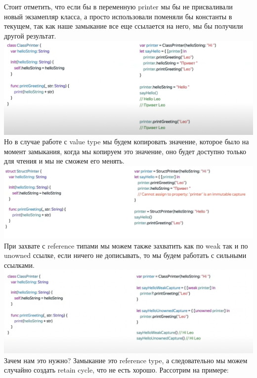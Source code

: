 \documentclass{article}
\begin{document}
    \newline
    Стоит отметить, что если бы в переменную printer мы бы не присваливали новый экзамепляр класса, а просто использовали поменяли бы константы в текущем, так как наше замыкание все еще ссылается на него, мы бы получили другой результат. 
    \newline
    \includegraphics[scale = 0.2]{pic/closurePrinterRefTypeSwiftAdv.png}
    \newline
    Но в случае работе с value type мы будем копировать значение, которое было на момент замыкания, когда мы копируем это значение, оно будет доступно только для чтения и мы не сможем его менять.
    \newline
    \includegraphics[scale = 0.4]{pic/closuerValueTypeSwiftAdv.png}
    \newline
    При захвате с reference типами мы можем также захватить как по weak так и по unowned ссылке, если ничего не дописывать, то мы будем работать с сильными ссылками. 
    \newline
    \includegraphics[scale = 0.4]{pic/Снимок экрана 2023-07-27 в 23.31.18.png}
    \newline
    Зачем нам это нужно? Замыкание это reference type, а следовательно мы можем случайно создать retain cycle, что не есть хорошо. Рассотрим на примере: 
\end{document}

